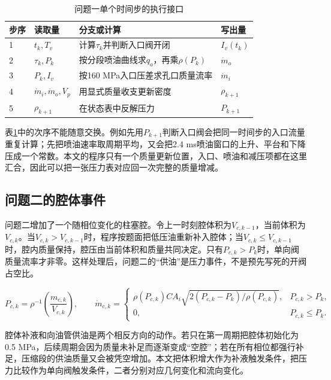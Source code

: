 \documentclass[UTF8,11pt,a4paper]{ctexart}
\begin{document}
\begin{table}[H]
\centering
\caption{问题一单个时间步的执行接口}
\label{tab:q1-step-a}
\small
\begin{tabularx}{\textwidth}{p{1.3cm}p{4.0cm}p{4.2cm}X}
\toprule
步序 & 读取量 & 分支或计算 & 写出量\\
\midrule
1 & $t_k,T_v$ & 计算$\tau_k$并判断入口阀开闭 & $I_v(t_k)$\\
2 & $\tau_k,P_k$ & 按分段喷油曲线求$q_o$，再乘$\rho(P_k)$ & $\dot m_o$\\
3 & $P_k,I_v$ & 按160 MPa入口压差求孔口质量流率 & $\dot m_i$\\
4 & $\dot m_i,\dot m_o,V_p$ & 用显式质量收支更新密度 & $\rho_{k+1}$\\
5 & $\rho_{k+1}$ & 在状态表中反解压力 & $P_{k+1}$\\
\bottomrule
\end{tabularx}
\end{table}

表\ref{tab:q1-step-a}中的次序不能随意交换。例如先用$P_{k+1}$判断入口阀会把同一时间步的入口流量重复计算；先把喷油速率取周期平均，又会把2.4 ms喷油窗口的上升、平台和下降压成一个常数。本文的程序只有一个质量更新位置，入口、喷油和减压项都在这里汇合，因此可以把一张压力表对应回一次完整的质量增减。

\subsection{问题二的腔体事件}

问题二增加了一个随相位变化的柱塞腔。令上一时刻腔体积为$V_{c,k-1}$，当前体积为$V_{c,k}$。当$V_{c,k}>V_{c,k-1}$时，程序按题面把低压油重新补入腔体；当$V_{c,k}\leq V_{c,k-1}$时，腔内质量保持，腔压由当前体积和质量共同决定。只有$P_{c,k}>P_k$时，单向阀质量流率才非零。这样处理后，问题二的“供油”是压力事件，不是预先写死的开阀占空比。

\begin{equation}
 P_{c,k}=\rho^{-1}\left(\frac{m_{c,k}}{V_{c,k}}\right),\qquad
 \dot m_{c,k}=\begin{cases}
 \rho(P_{c,k})CA_i\sqrt{2(P_{c,k}-P_k)/\rho(P_{c,k})},&P_{c,k}>P_k,\\
 0,&P_{c,k}\leq P_k.
 \end{cases}
\end{equation}

腔体补液和向油管供油是两个相反方向的动作。若只在第一周期把腔体初始化为0.5 MPa，后续周期会因为质量未补足而逐渐变成“空腔”；若在所有相位都强行补足，压缩段的供油质量又会被凭空增加。本文把体积增大作为补液触发条件，把压力比较作为单向阀触发条件，二者分别对应几何变化和流向变化。
\end{document}
